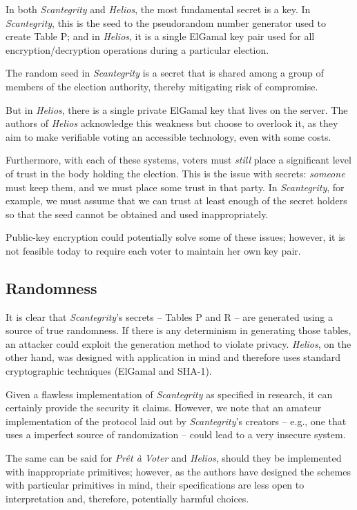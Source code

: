 \documentclass[10pt,twocolumn]{article}
\newcommand{\term}[1]{\textit{#1}}
\newcommand{\preta}{Pr\^{e}t \`{a}}
\newcommand{\pv}{\preta{} Voter}
\begin{document}
In both \term{Scantegrity} and \term{Helios}, the most fundamental secret is a key. In \term{Scantegrity}, this is the
seed to the pseudorandom number generator used to create Table P; and in \term{Helios}, it is a single
ElGamal key pair used for all encryption/decryption operations during a particular election.

The random seed in \term{Scantegrity} is a secret that is shared among a group of members of the election
authority, thereby mitigating risk of compromise.

But in \term{Helios}, there is a single private ElGamal key that lives on the server. The
authors of \term{Helios} acknowledge this weakness but choose to overlook it, as they aim to make
verifiable voting an accessible technology, even with some costs.

Furthermore, with each of these systems, voters must \emph{still} place a significant level of trust
in the body holding the election. This is the issue with secrets: \emph{someone} must keep them, and
we must place some trust in that party. In \term{Scantegrity}, for example, we must assume that we can
trust at least enough of the secret holders so that the seed cannot be obtained and used
inappropriately.

Public-key encryption could potentially solve some of these issues; however, it is not feasible
today to require each voter to maintain her own key pair.

\subsection{Randomness}

It is clear that \term{Scantegrity}'s secrets -- Tables P and R -- are generated using a source of true
randomness. If there is any determinism in generating those tables, an attacker could exploit the
generation method to violate privacy. \term{Helios}, on the other hand, was designed with application in
mind and therefore uses standard cryptographic techniques (ElGamal and SHA-1).

Given a flawless implementation of \term{Scantegrity} as specified in research, it can certainly provide the
security it claims. However, we note that an amateur implementation of the protocol laid out by
\term{Scantegrity}'s creators -- e.g., one that uses a imperfect source of randomization -- could lead to a
very insecure system.

The same can be said for \term{\pv{}} and \term{Helios}, should they be implemented with inappropriate primitives; however, as the authors have designed the schemes with particular primitives in mind, their
specifications are less open to interpretation and, therefore, potentially harmful choices.
\end{document}
